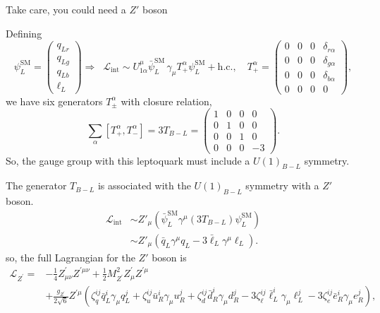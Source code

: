 \documentclass{../bredelebeamer}
\begin{document}
\begin{frame}{Take care, you could need a $Z'$ boson}

	Defining 
	$$
	\psi_{L}^{\mathrm{SM}}=\begin{pmatrix}
		q_{Lr}\\ q_{Lg}\\ q_{Lb}\\ \ell_L
	\end{pmatrix}
	\Longrightarrow\;\;
	\mathcal{L}_{\text{int}}
	\sim U_{1\alpha}^\mu \bar{\psi}_{L}^{\mathrm{SM}}\, \gamma_{\mu} T_{+}^{\alpha } \psi_{L}^{\mathrm{SM}} + \text{h.c.},
	\quad
	T_{+}^{\alpha}=\begin{pmatrix}
		0 & 0 & 0 & \delta_{r\alpha}\\
		0 & 0 & 0 & \delta_{g\alpha}\\
		0 & 0 & 0 & \delta_{b\alpha}\\
		0 & 0 & 0 & 0
	\end{pmatrix},
	$$
	we have six generators $T_{\pm}^{\alpha }$ with closure relation,
	$$
	\sum_{\alpha} \left[{T_{+}^{\alpha }},{T_{-}^{\alpha}}\right] =
	3 T_{B-L}=\begin{pmatrix}
		1 & 0 & 0 & 0\\
		0 & 1 & 0 & 0\\
		0 & 0 & 1 & 0\\
		0 & 0 & 0 & -3
	\end{pmatrix}.
	$$
	So, the gauge group with this leptoquark must include a $U(1)_{B-L}$ symmetry. 
	\pause

	The generator $T_{B-L}$ is associated with the $U(1)_{B-L}$ symmetry with a $Z'$ boson. 
	\begin{align*}
		\mathcal{L}_{\text{int}} &\sim Z'_\mu\left(\bar{\psi}_{L}^{\mathrm{SM}}\gamma^\mu (3T_{B-L}) \psi_{L}^{\mathrm{SM}}\right)\\
		&\sim Z'_\mu \left(\bar q_{L} \gamma^\mu q_{L} - 3 \bar \ell_L \gamma^\mu \ell_L\right).
	\end{align*}\pause
	so, the full Lagrangian for the $Z'$ boson is
	\begin{equation*}
		\begin{aligned}
		\mathcal{L}_{Z^{\prime}}= & -\frac{1}{4} Z_{\mu \nu}^{\prime} Z^{\prime \mu \nu} +\frac{1}{2} M_{Z^{\prime}}^2 Z_\mu^{\prime} Z^{\prime \mu} \\
		& +\frac{g_{Z^{\prime}} }{2 \sqrt{6}} Z^{\prime \mu}\left(\zeta_q^{i j} \bar{q}_L^i \gamma_\mu q_L^j+\zeta_u^{i j} \bar{u}_R^i \gamma_\mu u_R^j+\zeta_d^{i j} \bar{d}_R^i \gamma_\mu d_R^j-3 \zeta_{\ell}^{i j} \bar{\ell}_L^i \gamma_\mu \ell_L^j-3 \zeta_e^{i j} \bar{e}_R^i \gamma_\mu e_R^j\right),
		\end{aligned}
	\end{equation*}
\end{frame}
\end{document}
